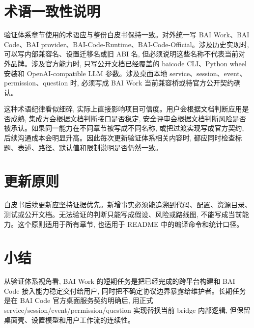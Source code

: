 \section{术语一致性说明}
验证体系章节使用的术语应与整份白皮书保持一致。对外统一写 BAI Work、BAI Code、BAI provider、BAI-Code-Runtime、BAI-Code-Official。涉及历史实现时, 可以写内部兼容名、设置迁移名或旧 ABI 名, 但必须说明这些名称不代表当前对外品牌。涉及官方能力时, 只写公开文档已经覆盖的 baicode CLI、Python wheel 安装和 OpenAI-compatible LLM 参数。涉及桌面本地 service、session、event、permission、question 时, 必须写成 BAI Work 当前兼容桥或待官方公开契约确认。

这种术语纪律看似细碎, 实际上直接影响项目可信度。用户会根据文档判断应用是否成熟, 集成方会根据文档判断接口是否稳定, 安全评审会根据文档判断风险是否被承认。如果同一能力在不同章节被写成不同名称, 或把过渡实现写成官方契约, 后续沟通成本会明显升高。因此每次更新验证体系相关内容时, 都应同时检查标题、表述、路径、默认值和限制说明是否仍然一致。

\section{更新原则}
白皮书后续更新应坚持证据优先。新增事实必须能追溯到代码、配置、资源目录、测试或公开文档。无法验证的判断只能写成假设、风险或路线图, 不能写成当前能力。这个原则适用于所有章节, 也适用于 README 中的编译命令和统计口径。

\section{小结}
从验证体系视角看, BAI Work 的短期任务是把已经完成的跨平台构建和 BAI Code 接入能力稳定交付给用户, 同时把不确定协议边界暴露给维护者。长期任务是在 BAI Code 官方桌面服务契约明确后, 用正式 service/session/event/permission/question 实现替换当前 bridge 内部逻辑, 但保留桌面壳、设置模型和用户工作流的连续性。
